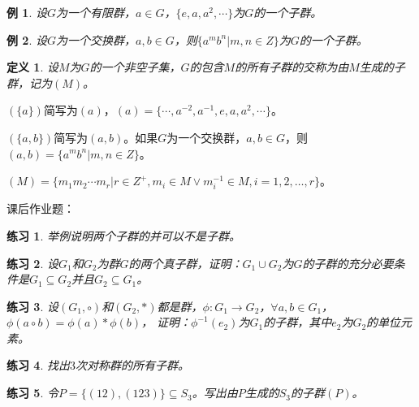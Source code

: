 \documentclass{article}
\newtheorem{Def}{定义}
\newtheorem{Exercise}{练习}
\newtheorem*{Example}{例}
\begin{document}
\begin{CJK*}{UTF8}{gbsn}
\begin{Example}
  设$G$为一个有限群，$a\in G$，$\{e,a,a^2,\cdots\}$为$G$的一个子群。
\end{Example}

\begin{Example}
  设$G$为一个交换群，$a,b\in G$，则$\{a^mb^n|m,n\in Z\}$为$G$的一个子群。
\end{Example}

\begin{Def}
  设$M$为$G$的一个非空子集，$G$的包含$M$的所有子群的交称为由$M$生成的子群，记为$(M)$。
\end{Def}

$(\{a\})$简写为$(a)$，$(a)=\{\cdots,a^{-2},a^{-1},e,a,a^2,\cdots\}$。

$(\{a,b\})$简写为$(a,b)$。如果$G$为一个交换群，$a,b\in G$，则$(a,b)=\{a^mb^n|m,n\in Z\}$。

$(M)=\{m_1m_2\cdots m_r|r\in Z^+,m_i\in M \lor m_i^{-1}\in M,i=1,2,\ldots,r\}$。

课后作业题：
\begin{Exercise}
举例说明两个子群的并可以不是子群。
\end{Exercise}
\begin{Exercise}
  设$G_1$和$G_2$为群$G$的两个真子群，证明：$G_1\cup G_2$为$G$的子群的充分必要条件是$G_1\subseteq G_2$并且$G_2\subseteq G_1$。
\end{Exercise}

\begin{Exercise}
  设$(G_1,\circ)$和$(G_2,*)$都是群，$\phi:G_1\to G_2$，$\forall a,b\in G_1$，$\phi(a\circ b)=\phi(a)*\phi(b)$，
  证明：$\phi^{-1}(e_2)$为$G_1$的子群，其中$e_2$为$G_2$的单位元素。
\end{Exercise}

\begin{Exercise}
  找出$3$次对称群的所有子群。
\end{Exercise}
\begin{Exercise}
  令$P=\{(12),(123)\}\subseteq S_3$。写出由$P$生成的$S_3$的子群$(P)$。
\end{Exercise}
\end{CJK*}
\end{document}
